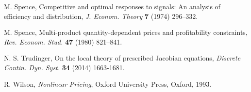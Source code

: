 \documentclass[a4paper, 11pt]{amsart}
\numberwithin{equation}{section}
\theoremstyle{plain}
\theoremstyle{definition}
\theoremstyle{remark}
\begin{document}
\begin{thebibliography}{BCDE}
	M. Spence, 
	Competitive and optimal responses to signals: An analysis of efficiency and distribution, 
	{\em J. Econom. Theory} {\bf 7} (1974) 296–332.

	M. Spence, 
	Multi-product quantity-dependent prices and profitability constraints, 
	{\em Rev. Econom. Stud.} {\bf 47} (1980) 821–841.
	
	N. S. Trudinger, 
	On the local theory of prescribed Jacobian equations, 
	{\em Discrete Contin. Dyn. Syst.} {\bf 34} (2014) 1663-1681.



	R. Wilson, 
	{\em Nonlinear Pricing}, 
	Oxford University Press, Oxford, 1993.

	
	
\end{thebibliography}


\bigskip
\end{document}
